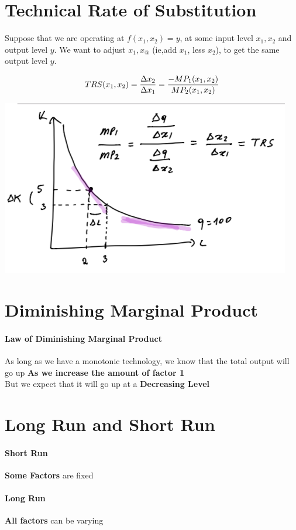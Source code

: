 \documentclass{report}
\begin{document}
\section{Technical Rate of Substitution}
Suppose that we are operating at $f(x_1,x_2) = y$, at some input level $x_1,x_2$ and output level $y$. We want to adjust $x_1,x_@$ (ie,add $x_1$, less $x_2$), to get the same output level $y$.
\begin{defbox}
$$TRS(x_1,x_2) = {{\Delta x_2}\over {\Delta x_1}} = {{-MP_1(x_1,x_2)}\over {MP_2(x_1,x_2)}}$$
\end{defbox}
\includegraphics[width = \textwidth]{econ7}
\section{Diminishing Marginal Product}
\paragraph{Law of Diminishing Marginal Product}
As long as we have a monotonic technology, we know that the total output will go up \textbf{As we increase the amount of factor 1}\\But we expect that it will go up at a \textbf{Decreasing Level}
\section{Long Run and Short Run}
\begin{defbox}
\paragraph{Short Run}
\textbf{Some Factors} are fixed
\paragraph{Long Run}
\textbf{All factors} can be varying
\end{defbox}
\end{document}
